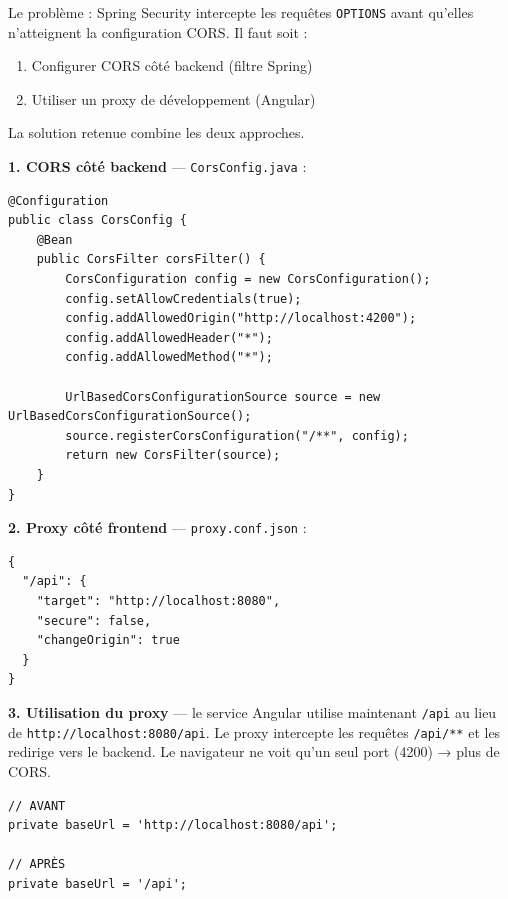 \documentclass[a4paper,12pt,french]{article}
\begin{document}
Le problème : Spring Security intercepte les requêtes \texttt{OPTIONS} avant qu'elles n'atteignent la configuration CORS. Il faut soit :
\begin{enumerate}
    \item Configurer CORS côté backend (filtre Spring)
    \item Utiliser un proxy de développement (Angular)
\end{enumerate}

La solution retenue combine les deux approches.

\begin{solutionbox}
\textbf{1. CORS côté backend} — \texttt{CorsConfig.java} :

\begin{lstlisting}[style=javastyle]
@Configuration
public class CorsConfig {
    @Bean
    public CorsFilter corsFilter() {
        CorsConfiguration config = new CorsConfiguration();
        config.setAllowCredentials(true);
        config.addAllowedOrigin("http://localhost:4200");
        config.addAllowedHeader("*");
        config.addAllowedMethod("*");
        
        UrlBasedCorsConfigurationSource source = new UrlBasedCorsConfigurationSource();
        source.registerCorsConfiguration("/**", config);
        return new CorsFilter(source);
    }
}
\end{lstlisting}

\textbf{2. Proxy côté frontend} — \texttt{proxy.conf.json} :

\begin{lstlisting}[style=tsstyle]
{
  "/api": {
    "target": "http://localhost:8080",
    "secure": false,
    "changeOrigin": true
  }
}
\end{lstlisting}

\textbf{3. Utilisation du proxy} — le service Angular utilise maintenant \texttt{/api} au lieu de \texttt{http://localhost:8080/api}. Le proxy intercepte les requêtes \texttt{/api/**} et les redirige vers le backend. Le navigateur ne voit qu'un seul port (4200) → plus de CORS.

\begin{lstlisting}[style=tsstyle]
// AVANT
private baseUrl = 'http://localhost:8080/api';

// APRÈS
private baseUrl = '/api';
\end{lstlisting}
\end{solutionbox}
\end{document}
